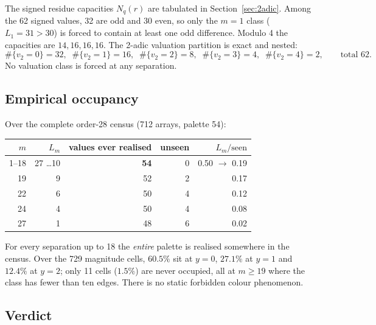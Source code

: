 \documentclass[11pt,a4paper]{article}
\theoremstyle{definition}
\newcommand{\vtwo}{v_2}
\begin{document}
The signed residue capacities $N_q(r)$ are tabulated in
Section~\ref{sec:2adic}. Among the 62 signed values, 32 are odd and 30 even, so
only the $m=1$ class ($L_1=31>30$) is forced to contain at least one odd
difference. Modulo 4 the capacities are $14,16,16,16$. The 2-adic valuation
partition is exact and nested:
\[
\#\{\vtwo=0\}=32,\;\;
\#\{\vtwo=1\}=16,\;\;
\#\{\vtwo=2\}=8,\;\;
\#\{\vtwo=3\}=4,\;\;
\#\{\vtwo=4\}=2,\qquad \text{total }62.
\]
No valuation class is forced at any separation.

\subsection{Empirical occupancy}

Over the complete order-28 census (712 arrays, palette 54):

\begin{center}
\begin{tabular}{@{}rrrrr@{}}
\toprule
$m$ & $L_m$ & values ever realised & unseen & $L_m/\text{seen}$ \\
\midrule
1--18 & 27 \dots 10 & \textbf{54} & 0 & 0.50 $\to$ 0.19 \\
19 & 9 & 52 & 2 & 0.17 \\
22 & 6 & 50 & 4 & 0.12 \\
24 & 4 & 50 & 4 & 0.08 \\
27 & 1 & 48 & 6 & 0.02 \\
\bottomrule
\end{tabular}
\end{center}

For every separation up to 18 the \emph{entire} palette is realised somewhere in
the census. Over the 729 magnitude cells, $60.5\%$ sit at $y=0$, $27.1\%$ at
$y=1$ and $12.4\%$ at $y=2$; only 11 cells ($1.5\%$) are never occupied, all at
$m\ge19$ where the class has fewer than ten edges. There is no static forbidden
colour phenomenon.

\subsection{Verdict}
\end{document}
